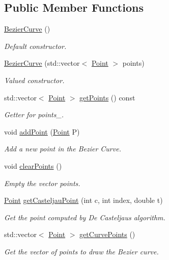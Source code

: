 \subsection*{Public Member Functions}
\begin{DoxyCompactItemize}
\item 
\mbox{\hyperlink{class_bezier_curve_af30b8df568e50499b596aff578198425}{Bezier\+Curve}} ()
\begin{DoxyCompactList}\small\item\em Default constructor. \end{DoxyCompactList}\item 
\mbox{\hyperlink{class_bezier_curve_abf9565fc1a6be43b0f1503e2db52ffd1}{Bezier\+Curve}} (std\+::vector$<$ \mbox{\hyperlink{class_point}{Point}} $>$ points)
\begin{DoxyCompactList}\small\item\em Valued constructor. \end{DoxyCompactList}\item 
std\+::vector$<$ \mbox{\hyperlink{class_point}{Point}} $>$ \mbox{\hyperlink{class_bezier_curve_a0ebb942d8285628bead89d154f39e616}{get\+Points}} () const
\begin{DoxyCompactList}\small\item\em Getter for points\+\_\+. \end{DoxyCompactList}\item 
void \mbox{\hyperlink{class_bezier_curve_a38d16c18b36ae45619b05e26e226cf34}{add\+Point}} (\mbox{\hyperlink{class_point}{Point}} P)
\begin{DoxyCompactList}\small\item\em Add a new point in the Bezier Curve. \end{DoxyCompactList}\item 
void \mbox{\hyperlink{class_bezier_curve_a0ba8ce66d5af5971ae6a1b506029728e}{clear\+Points}} ()
\begin{DoxyCompactList}\small\item\em Empty the vector points. \end{DoxyCompactList}\item 
\mbox{\hyperlink{class_point}{Point}} \mbox{\hyperlink{class_bezier_curve_a7e0c40cb373da6aa1aa1acd5fce9d503}{get\+Casteljau\+Point}} (int c, int index, double t)
\begin{DoxyCompactList}\small\item\em Get the point computed by De Casteljau\textquotesingle{}s algorithm. \end{DoxyCompactList}\item 
std\+::vector$<$ \mbox{\hyperlink{class_point}{Point}} $>$ \mbox{\hyperlink{class_bezier_curve_a2b4482d322a84df3fa22f4e491cb2bc3}{get\+Curve\+Points}} ()
\begin{DoxyCompactList}\small\item\em Get the vector of points to draw the Bezier curve. \end{DoxyCompactList}\end{DoxyCompactItemize}
